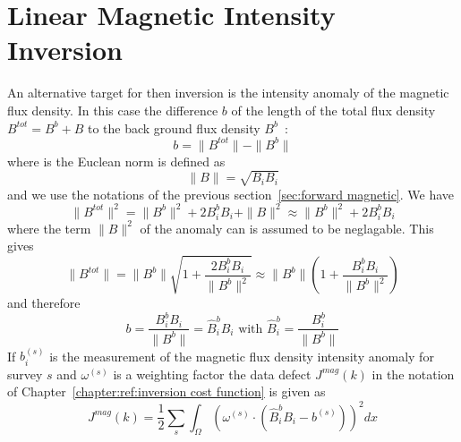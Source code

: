 
%
%
%


\section{Linear Magnetic Intensity Inversion}\label{sec:forward magnetic intensity}
An alternative target for then inversion is the intensity anomaly of the magnetic flux
density. In this case the difference $b$ of the length of the total flux
density $B^{tot}=B^b+B$ to the back ground flux density $B^b$~:
\begin{equation}\label{ref:IMAG:EQU:0}
b=\|B^{tot}\| -\|B^{b}\|
\end{equation}
where is the Euclean norm is defined as  
\begin{equation}\label{ref:IMAG:EQU:1}
\|B\| =  \sqrt{B_i B_i}
\end{equation}
and we use the notations of the previous section~\ref{sec:forward magnetic}.   
We have 
\begin{equation}\label{ref:IMAG:EQU:1b}
\|B^{tot}\|^2 = \|B^{b}\|^2 + 2 B^{b}_i B_i + \|B\|^2 \approx  \|B^{b}\|^2 + 2 B^{b}_i B_i
\end{equation}
where the term $\|B\|^2$ of the anomaly can is assumed to be neglagable. 
This gives 
\begin{equation}\label{ref:IMAG:EQU:1bb}
\|B^{tot}\|  = \|B^{b}\| \sqrt{1 + \frac{2 B^{b}_i B_i}{\|B^{b}\|^2}} \approx  \|B^{b}\| \left(1 + \frac{B^{b}_i B_i}{\|B^{b}\|^2} \right) 
\end{equation}
and therefore
\begin{equation}\label{ref:IMAG:EQU:0b}
b= \frac{B^{b}_i B_i}{\|B^{b}\|}  = \hat{B}^{b}_i B_i \mbox{ with } \hat{B}^{b}_i = \frac{B^b_i}{\|B^{b}\|} 
\end{equation}
If $b^{(s)}_i$ is the measurement of the magnetic flux density intensity anomaly for
survey $s$ and $\omega^{(s)}$ is a weighting factor the data defect
$J^{mag}(k)$ in the notation of Chapter~\ref{chapter:ref:inversion cost function} is given as
\begin{equation}\label{ref:IMAG:EQU:9}
J^{mag}(k) = \frac{1}{2}\sum_{s} \int_{\Omega} \left( \omega^{(s)} \cdot ( \hat{B}^{b}_i B_i - b^{(s)} )\right)^2 dx
\end{equation} 

